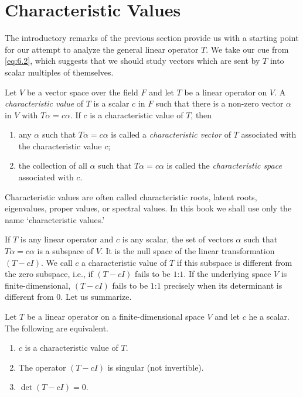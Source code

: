 \section{Characteristic Values}

The introductory remarks of the previous section provide us with a starting point for our attempt to analyze the general linear operator \(T\). We take our cue from \eqref{eq:6.2}, which suggests that we should study vectors which are sent by \(T\) into scalar multiples of themselves.

\begin{definition}
    Let \(V\) be a vector space over the field \(F\) and let \(T\) be a linear operator on \(V\). A \emph{characteristic value} of \(T\) is a scalar \(c\) in \(F\) such that there is a non-zero vector \(\alpha\) in \(V\) with \(T\alpha=c\alpha\). If \(c\) is a characteristic value of \(T\), then
    \begin{enumerate}
        \item any \(\alpha\) such that \(T\alpha=c\alpha\) is called a \emph{characteristic vector} of \(T\) associated with the characteristic value \(c\);
        \item the collection of all \(\alpha\) such that \(T\alpha=c\alpha\) is called the \emph{characteristic space} associated with \(c\).
    \end{enumerate}
\end{definition}

Characteristic values are often called characteristic roots, latent roots, eigenvalues, proper values, or spectral values. In this book we shall use only the name `characteristic values.'

If \(T\) is any linear operator and \(c\) is any scalar, the set of vectors \(\alpha\) such that \(T\alpha=c\alpha\) is a subspace of \(V\). It is the null space of the linear transformation \(\left(T-cI\right)\). We call \(c\) a characteristic value of \(T\) if this subspace is different from the zero subspace, i.e., if \(\left(T-cI\right)\) fails to be \(1\):\(1\). If the underlying space \(V\) is finite-dimensional, \(\left(T-cI\right)\) fails to be \(1\):\(1\) precisely when its determinant is different from \(0\). Let us summarize.

\begin{theorem}
    Let \(T\) be a linear operator on a finite-dimensional space \(V\) and let \(c\) he a scalar. The following are equivalent.
    \begin{enumerate}
        \item \(c\) is a characteristic value of \(T\).
        \item The operator \(\left(T-cI\right)\) is singular (not invertible).
        \item\label{itm:6.2.5} \(\det\left(T-cI\right)=0\).
    \end{enumerate}
\end{theorem}

